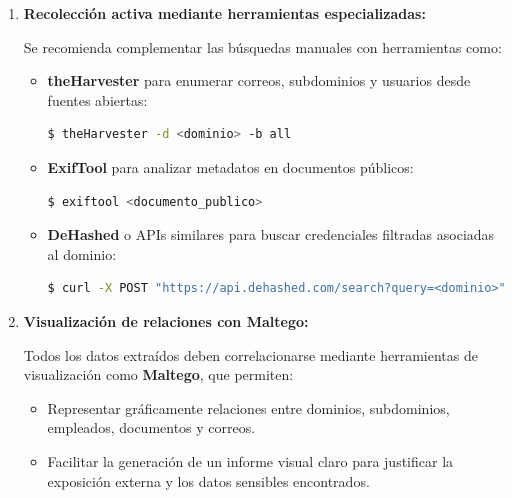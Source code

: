 \documentclass[a4paper, 11pt]{article}
\begin{document}
\begin{enumerate}
    \item \textbf{Recolección activa mediante herramientas especializadas:}

    Se recomienda complementar las búsquedas manuales con herramientas como:

    \begin{itemize}
        \item \textbf{theHarvester} para enumerar correos, subdominios y usuarios desde fuentes abiertas:
        \begin{lstlisting}[language=bash, style=terminalstyle, caption=Enumeración con theHarvester]
$ theHarvester -d <dominio> -b all
        \end{lstlisting}

        \item \textbf{ExifTool} para analizar metadatos en documentos públicos:
        \begin{lstlisting}[language=bash, style=terminalstyle, caption=Extracción de metadatos]
$ exiftool <documento_publico>
        \end{lstlisting}

        \item \textbf{DeHashed} o APIs similares para buscar credenciales filtradas asociadas al dominio:
        \begin{lstlisting}[language=bash, style=terminalstyle, caption=Búsqueda de filtraciones con DeHashed]
$ curl -X POST "https://api.dehashed.com/search?query=<dominio>" -u usuario:api_key
        \end{lstlisting}
    \end{itemize}

    \item \textbf{Visualización de relaciones con Maltego:}

    Todos los datos extraídos deben correlacionarse mediante herramientas de visualización como \textbf{Maltego}, que permiten:

    \begin{itemize}
        \item Representar gráficamente relaciones entre dominios, subdominios, empleados, documentos y correos.
        \item Facilitar la generación de un informe visual claro para justificar la exposición externa y los datos sensibles encontrados.
    \end{itemize}

\end{enumerate}

\vspace{0.5cm}
\end{document}

